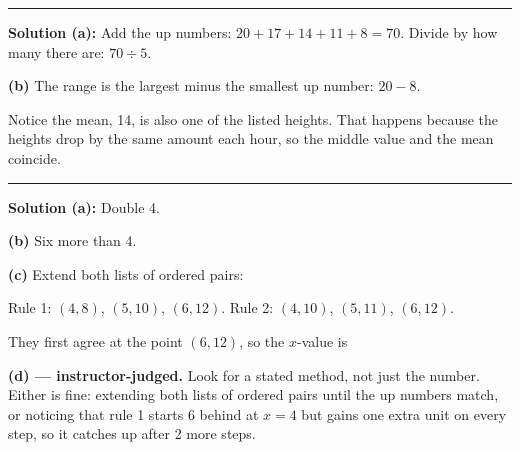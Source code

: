 \documentclass[12pt]{article}
\begin{document}
\vspace{0.15cm}\noindent\rule{\linewidth}{0.2pt}\vspace{0.15cm}


\textbf{Solution (a):} Add the up numbers: $20 + 17 + 14 + 11 + 8 = 70$. Divide by how many there are: $70 \div 5$. 

\textbf{(b)} The range is the largest minus the smallest up number: $20 - 8$. 

Notice the mean, 14, is also one of the listed heights. That happens because the heights drop by the same amount each hour, so the middle value and the mean coincide.

\vspace{0.15cm}\noindent\rule{\linewidth}{0.2pt}\vspace{0.15cm}


\textbf{Solution (a):} Double 4. 

\textbf{(b)} Six more than 4. 

\textbf{(c)} Extend both lists of ordered pairs:

Rule 1: $(4, 8)$, $(5, 10)$, $(6, 12)$. \quad Rule 2: $(4, 10)$, $(5, 11)$, $(6, 12)$.

They first agree at the point $(6, 12)$, so the $x$-value is 

\textbf{(d) --- instructor-judged.} Look for a stated method, not just the number. Either is fine: extending both lists of ordered pairs until the up numbers match, or noticing that rule 1 starts 6 behind at $x = 4$ but gains one extra unit on every step, so it catches up after 2 more steps.
\end{document}
